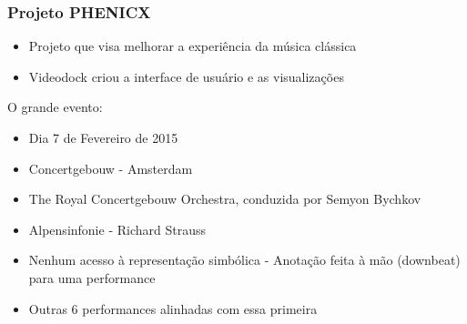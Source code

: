 \begin{frame}
  \frametitle{Projeto PHENICX}
  \begin{itemize}
    \item Projeto que visa melhorar a experiência da música clássica\pause
    \item Videodock criou a interface de usuário e as visualizações \pause
  \end{itemize}
  O grande evento: \pause
  \begin{itemize}
    \item Dia 7 de Fevereiro de 2015\pause
    \item Concertgebouw - Amsterdam\pause
    \item The Royal Concertgebouw Orchestra, conduzida por Semyon Bychkov\pause
    \item Alpensinfonie - Richard Strauss\pause
    \item Nenhum acesso à representação simbólica - Anotação feita à mão (downbeat) para uma performance\pause
    \item Outras 6 performances alinhadas com essa primeira
  \end{itemize}
\end{frame}

